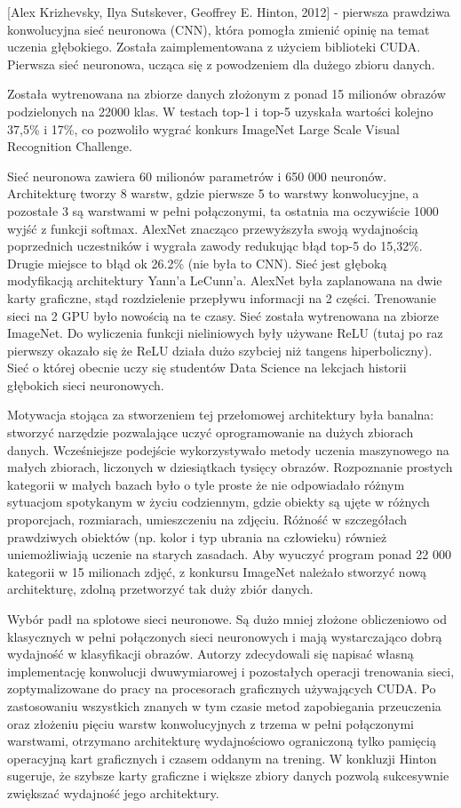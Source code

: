 \documentclass[12pt,a4paper,twoside,titlepage,openright]{book}
\begin{document}
 [Alex Krizhevsky, Ilya Sutskever, Geoffrey E. Hinton, 2012] - pierwsza prawdziwa konwolucyjna sieć neuronowa (CNN), która pomogła zmienić opinię na temat uczenia głębokiego. Została zaimplementowana z użyciem biblioteki CUDA. Pierwsza sieć neuronowa, ucząca się z powodzeniem dla dużego zbioru danych.
 
 Została wytrenowana na zbiorze danych złożonym z ponad 15 milionów obrazów podzielonych na 22000 klas. 
 W testach top-1 i top-5 uzyskała wartości kolejno 37,5\% i 17\%, co pozwoliło wygrać konkurs ImageNet Large Scale Visual Recognition Challenge. 
 
 Sieć neuronowa zawiera 60 milionów parametrów i 650 000 neuronów. Architekturę tworzy 8 warstw, gdzie pierwsze 5 to warstwy konwolucyjne, a pozostałe 3 są warstwami w pełni połączonymi, ta ostatnia ma oczywiście 1000 wyjść z funkcji softmax. AlexNet znacząco przewyższyła swoją wydajnością poprzednich uczestników i wygrała zawody redukując błąd top-5 do 15,32\%. Drugie miejsce to błąd ok 26.2\% (nie była to CNN). Sieć jest głęboką modyfikacją architektury Yann’a LeCunn’a. AlexNet była zaplanowana na dwie karty graficzne, stąd rozdzielenie przepływu informacji na 2 części. Trenowanie sieci na 2 GPU było nowością na te czasy. Sieć została wytrenowana na zbiorze ImageNet. Do wyliczenia funkcji nieliniowych były używane ReLU (tutaj po raz pierwszy okazało się że ReLU działa dużo szybciej niż tangens hiperboliczny). Sieć o której obecnie uczy się studentów Data Science na lekcjach historii głębokich sieci neuronowych.
 
 Motywacja stojąca za stworzeniem tej przełomowej architektury była banalna: stworzyć narzędzie pozwalające uczyć oprogramowanie na dużych zbiorach danych.
 Wcześniejsze podejście wykorzystywało metody uczenia maszynowego na małych zbiorach, liczonych w dziesiątkach tysięcy obrazów. Rozpoznanie prostych kategorii w małych bazach było o tyle proste że nie odpowiadało różnym sytuacjom spotykanym w życiu codziennym, gdzie obiekty są ujęte w różnych proporcjach, rozmiarach, umieszczeniu na zdjęciu. Różność w szczegółach prawdziwych obiektów (np. kolor i typ ubrania na człowieku) również uniemożliwiają uczenie na starych zasadach. Aby wyuczyć program ponad 22 000 kategorii w 15 milionach zdjęć, z konkursu ImageNet należało stworzyć nową architekturę, zdolną przetworzyć tak duży zbiór danych.
 
 Wybór padł na splotowe sieci neuronowe. Są dużo mniej złożone obliczeniowo od klasycznych w pełni połączonych sieci neuronowych i mają wystarczająco dobrą wydajność w klasyfikacji obrazów. Autorzy zdecydowali się napisać własną implementację konwolucji dwuwymiarowej i pozostałych operacji trenowania sieci, zoptymalizowane do pracy na procesorach graficznych używających CUDA. Po zastosowaniu wszystkich znanych w tym czasie metod zapobiegania przeuczenia oraz złożeniu pięciu warstw konwolucyjnych z trzema w pełni połączonymi warstwami, otrzymano architekturę wydajnościowo ograniczoną tylko pamięcią operacyjną kart graficznych i czasem oddanym na trening. W konkluzji Hinton sugeruje, że szybsze karty graficzne i większe zbiory danych pozwolą sukcesywnie zwiększać wydajność jego architektury.
 
\end{document}
